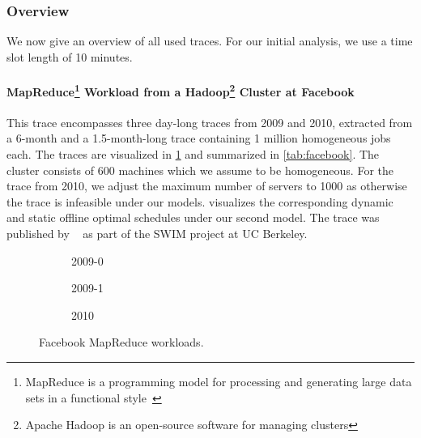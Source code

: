 \subsubsection{Overview}

We now give an overview of all used traces. For our initial analysis, we use a time slot length of 10 minutes.

\paragraph{MapReduce\footnote{MapReduce is a programming model for processing and generating large data sets in a functional style~\cite{Dean2004}} Workload from a Hadoop\footnote{Apache Hadoop is an open-source software for managing clusters} Cluster at Facebook~\cite{SWIM2013}} This trace encompasses three day-long traces from 2009 and 2010, extracted from a 6-month and a 1.5-month-long trace containing 1 million homogeneous jobs each. The traces are visualized in \cref{fig:facebook:histogram} and summarized in \cref{tab:facebook}. The cluster consists of 600 machines which we assume to be homogeneous. For the trace from 2010, we adjust the maximum number of servers to 1000 as otherwise the trace is infeasible under our models.  visualizes the corresponding dynamic and static offline optimal schedules under our second model. The trace was published by \citeauthor*{SWIM2013}~\cite{SWIM2013} as part of the SWIM project at UC Berkeley.

\begin{figure}
    \begin{subfigure}[b]{.3425\linewidth}
    \resizebox{\textwidth}{!}{}
    \caption{2009-0}
    \end{subfigure}
    \begin{subfigure}[b]{.32\linewidth}
    \resizebox{\textwidth}{!}{}
    \caption{2009-1}
    \end{subfigure}
    \begin{subfigure}[b]{.32\linewidth}
    \resizebox{\textwidth}{!}{}
    \caption{2010}
    \end{subfigure}
    \caption{Facebook MapReduce workloads.}
    \label{fig:facebook:histogram}
\end{figure}

